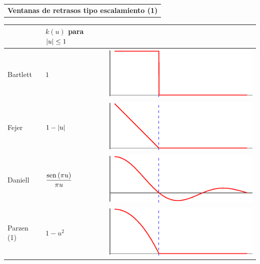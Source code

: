 
\begin{SidewaysTable}
\centering
{}
\begin{tabular}{c}
\textbf{Ventanas de retrasos tipo escalamiento (1)}
\vspace{1em}
\end{tabular}

{
\begin{tabular}{lll}
\toprule
& $k(u)$ para $\left| u \right| \leq 1$ & \\
\midrule
Bartlett &
$\displaystyle 
1 
$
& \includegraphics[scale=.66]{./img_ventanas/ventana_bartlett.pdf}
\\
\rowcolor{gris}
Fejer &
$\displaystyle 
1-\left| u \right|
$
& \includegraphics[scale=.66]{./img_ventanas/ventana_fejer.pdf}
\\
Daniell &
$\displaystyle 
\frac{\mathrm{sen}\left( \pi u \right)}{\pi u}
$
& \includegraphics[scale=.66]{./img_ventanas/ventana_daniell.pdf}
\\
\rowcolor{gris}
Parzen (1) &
$\displaystyle 
1-u^{2}
$
& \includegraphics[scale=.66]{./img_ventanas/ventana_parzen1.pdf}

\end{tabular}}
\end{SidewaysTable}
